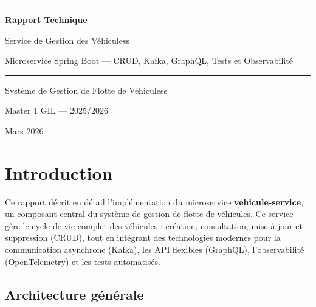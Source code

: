 \documentclass[12pt,a4paper]{report}
\begin{document}
\begin{titlepage}
\centering
\vspace*{2cm}

{\color{primary}\rule{\linewidth}{1pt}}
\vspace{0.5cm}

{\Huge\bfseries\color{primary} Rapport Technique\par}
\vspace{0.4cm}
{\LARGE\color{secondary} Service de Gestion des V\'ehiculess\par}
\vspace{0.3cm}
{\large Microservice Spring Boot --- CRUD, Kafka, GraphQL, Tests et Observabilit\'e\par}

\vspace{0.5cm}
{\color{primary}\rule{\linewidth}{1pt}}

\vspace{2cm}

{\Large Syst\`eme de Gestion de Flotte de V\'ehiculess\par}
\vspace{1cm}
{\large Master 1 GIL --- 2025/2026\par}
\vspace{0.5cm}
{\large Mars 2026\par}

\vfill
\end{titlepage}

\chapter{Introduction}

Ce rapport d\'ecrit en d\'etail l'impl\'ementation du microservice \textbf{vehicule-service}, un composant central du syst\`eme de gestion de flotte de v\'ehicules. Ce service g\`ere le cycle de vie complet des v\'ehicules : cr\'eation, consultation, mise \`a jour et suppression (CRUD), tout en int\'egrant des technologies modernes pour la communication asynchrone (Kafka), les API flexibles (GraphQL), l'observabilit\'e (OpenTelemetry) et les tests automatis\'es.

\section{Architecture g\'en\'erale}
\end{document}
